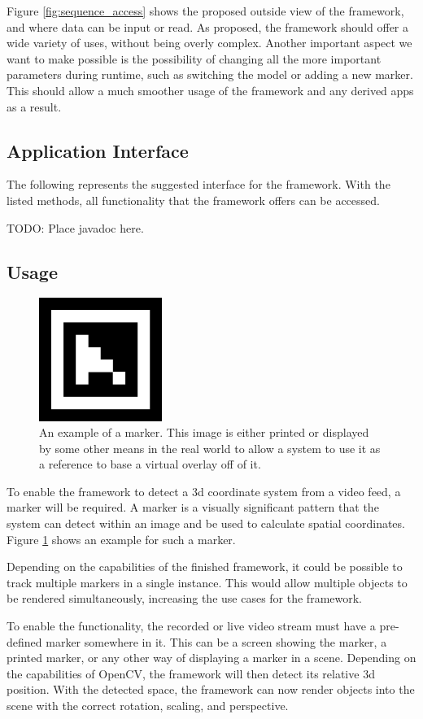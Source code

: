 Figure \ref{fig:sequence_access} shows the proposed outside view of the framework, and where data can be input or read.
As proposed, the framework should offer a wide variety of uses, without being overly complex.
Another important aspect we want to make possible is the possibility of changing all the more important parameters during runtime, such as switching the model or adding a new marker.
This should allow a much smoother usage of the framework and any derived apps as a result.

\subsection{Application Interface}

The following represents the suggested interface for the framework.
With the listed methods, all functionality that the framework offers can be accessed.

TODO: Place javadoc here.

\subsection{Usage}

\begin{figure}
	\centering
	\includegraphics[width=4cm]{images/marker_example.png}
	\caption[Example Marker.]{An example of a marker. This image is either printed or displayed by some other means in the real world to allow a system to use it as a reference to base a virtual overlay off of it.}
	\label{fig:marker_example}
\end{figure}

To enable the framework to detect a 3d coordinate system from a video feed, a marker will be required.
A marker is a visually significant pattern that the system can detect within an image and be used to calculate spatial coordinates. Figure \ref{fig:marker_example} shows an example for such a marker.

Depending on the capabilities of the finished framework, it could be possible to track multiple markers in a single instance.
This would allow multiple objects to be rendered simultaneously, increasing the use cases for the framework.

To enable the functionality, the recorded or live video stream must have a pre-defined marker somewhere in it.
This can be a screen showing the marker, a printed marker, or any other way of displaying a marker in a scene.
Depending on the capabilities of OpenCV, the framework will then detect its relative 3d position.
With the detected space, the framework can now render objects into the scene with the correct rotation, scaling, and perspective.

